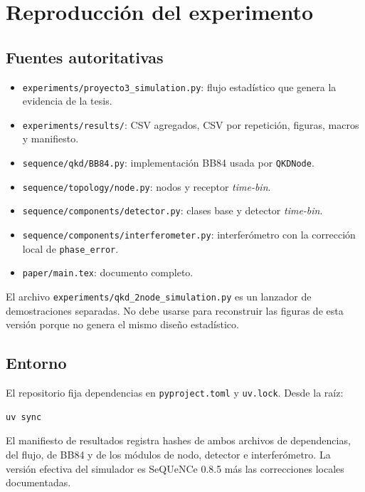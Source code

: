 \chapter{Reproducción del experimento}
\label{app:reproduccion}

\section{Fuentes autoritativas}

\begin{itemize}
  \item \texttt{experiments/proyecto3\_simulation.py}: flujo estadístico que genera la evidencia de la tesis.
  \item \texttt{experiments/results/}: CSV agregados, CSV por repetición, figuras, macros y manifiesto.
  \item \texttt{sequence/qkd/BB84.py}: implementación BB84 usada por \texttt{QKDNode}.
  \item \texttt{sequence/topology/node.py}: nodos y receptor \textit{time-bin}.
  \item \texttt{sequence/components/detector.py}: clases base y detector \textit{time-bin}.
  \item \texttt{sequence/components/interferometer.py}: interferómetro con la corrección local de \texttt{phase\_error}.
  \item \texttt{paper/main.tex}: documento completo.
\end{itemize}

El archivo \texttt{experiments/qkd\_2node\_simulation.py} es un lanzador de demostraciones separadas. No debe usarse para reconstruir las figuras de esta versión porque no genera el mismo diseño estadístico.

\section{Entorno}

El repositorio fija dependencias en \texttt{pyproject.toml} y \texttt{uv.lock}. Desde la raíz:

\begin{verbatim}
uv sync
\end{verbatim}

El manifiesto de resultados registra hashes de ambos archivos de dependencias, del flujo, de BB84 y de los módulos de nodo, detector e interferómetro. La versión efectiva del simulador es SeQUeNCe 0.8.5 más las correcciones locales documentadas.


